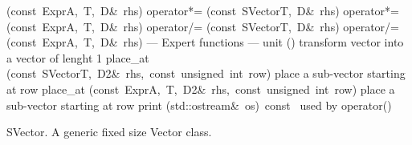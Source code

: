 \documentclass{article}
\begin{document}
\begin{cxxentry}
\begin{cxxclass}
\begin{cxxpublic}
        {(const\ Expr\<A,\ T,\ D\>\&\ rhs)}
        {}
        {}
\label{cxx.1.1.47}
        {operator*=}
        {(const\ SVector\<T,\ D\>\&\ rhs)}
        {}
        {}
\label{cxx.1.1.48}
        {operator*=}
        {(const\ Expr\<A,\ T,\ D\>\&\ rhs)}
        {}
        {}
\label{cxx.1.1.49}
        {operator/=}
        {(const\ SVector\<T,\ D\>\&\ rhs)}
        {}
        {}
\label{cxx.1.1.50}
        {operator/=}
        {(const\ Expr\<A,\ T,\ D\>\&\ rhs)}
        {}
        {}
\label{cxx.1.1.51}
\cxxitem{}
        {--- Expert functions --- }
        {}
        {}
        {}
\label{cxx.1.1.52}
        {unit}
        {()}
        { transform vector into a vector of lenght 1}
        {}
\label{cxx.1.1.53}
        {place\_at}
        {(const\ SVector\<T,\ D2\>\&\ rhs,\ const\ unsigned\ int\ row)}
        { place a sub-vector starting at \<row\>}
        {}
\label{cxx.1.1.54}
        {place\_at}
        {(const\ Expr\<A,\ T,\ D2\>\&\ rhs,\ const\ unsigned\ int\ row)}
        { place a sub-vector starting at \<row\>}
        {}
\label{cxx.1.1.55}
        {print}
        {(std::ostream\&\ os)\ const\ }
        { used by operator\<\<()}
        {}
\label{cxx.1.1.56}
\end{cxxpublic}
\begin{cxxdoc}
SVector.
A generic fixed size Vector class.



\end{cxxdoc}
\end{cxxclass}
\end{cxxentry}
\end{document}

